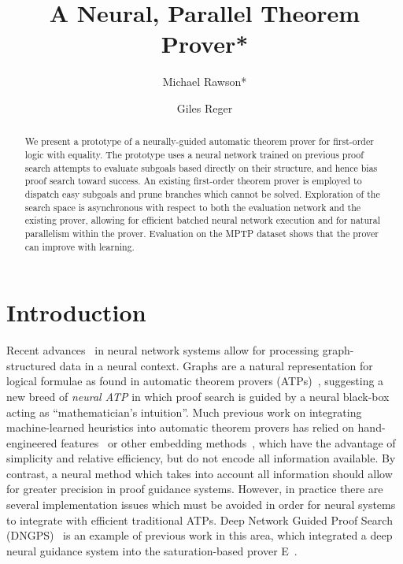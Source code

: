 \documentclass[runningheads]{llncs}
\begin{document}
\title{A Neural, Parallel Theorem Prover*}
\author{
	Michael Rawson* \and
	Giles Reger
}
\maketitle

\begin{abstract}
	We present a prototype of a neurally-guided automatic theorem prover for first-order logic with equality.
	The prototype uses a neural network trained on previous proof search attempts to evaluate subgoals based directly on their structure, and hence bias proof search toward success.
	An existing first-order theorem prover is employed to dispatch easy subgoals and prune branches which cannot be solved.
	Exploration of the search space is asynchronous with respect to both the evaluation network and the existing prover, allowing for efficient batched neural network execution and for natural parallelism within the prover.
	Evaluation on the MPTP dataset shows that the prover can improve with learning.
\end{abstract}

\section{Introduction}
Recent advances~\cite{graph-cnn,gcn,gcn-relational} in neural network systems allow for processing graph-structured data in a neural context.
Graphs are a natural representation for logical formulae as found in automatic theorem provers (ATPs)~\cite{formula-graph}, suggesting a new breed of \emph{neural ATP} in which proof search is guided by a neural black-box acting as ``mathematician's intuition''.
Much previous work on integrating machine-learned heuristics into automatic theorem provers has relied on hand-engineered features~\cite{MaLeCoP,FEMaLeCoP,rlCoP} or other embedding methods~\cite{ENIGMA}, which have the advantage of simplicity and relative efficiency, but do not encode all information available.
By contrast, a neural method which takes into account all information should allow for greater precision in proof guidance systems.
However, in practice there are several implementation issues which must be avoided in order for neural systems to integrate with efficient traditional ATPs.
Deep Network Guided Proof Search (DNGPS)~\cite{DNGPS} is an example of previous work in this area, which integrated a deep neural guidance system into the saturation-based prover E~\cite{E}.
\end{document}
